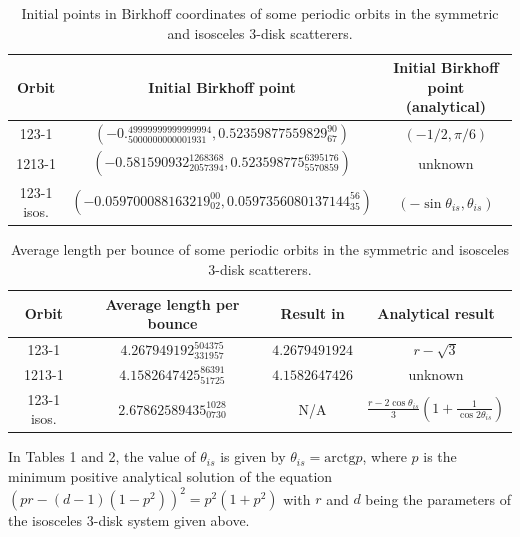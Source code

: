 \documentclass[pre, amsmath, amssymb, onecolumn, showpacs]{revtex4-1}
\begin{document}
\begin{table}[h!]
\centering
\begin{tabular}{||c c c ||} 
 \hline
 Orbit & Initial Birkhoff point & Initial Birkhoff point (analytical) \\ [0.5ex] 
 \hline\hline
 123-1 & $(-0._{5000000000001931}^{49999999999999994}, 0.52359877559829_{67}^{90})$ & $(-1/2, \pi/6)$ \\ [1ex] 
 1213-1 & $(-0.581590932_{2057394}^{1268368}, 0.523598775_{5570859}^{6395176})$ & unknown  \\ [1ex] 
 123-1 isos. & $(-0.059700088163219_{02}^{00}, 0.0597356080137144_{35}^{56})$ & $(-\sin \theta_{is}, \theta_{is})$ \\ [1ex]
 \hline
\end{tabular}
\caption{Initial points in Birkhoff coordinates of some periodic orbits in the symmetric and isosceles 3-disk scatterers.}
\label{table:1}
\end{table}

\begin{table}[h!]
\centering
\begin{tabular}{||c c c c||} 
 \hline
 Orbit & Average length per bounce & Result in \cite{gaspard2005chaos} & Analytical result \\ [0.5ex] 
 \hline\hline
 123-1 & $4.267949192_{331957}^{504375}$ & $4.2679491924$ & $r - \sqrt{3}$ \\ [1ex] 
 1213-1 & $4.1582647425_{51725}^{86391}$ & $4.1582647426$ & unknown \\ [1ex] 
 123-1 isos. & $2.67862589435_{0730}^{1028}$ & N/A & $\frac{r - 2 \cos{\theta_{is}}}{3} (1 + \frac{1}{\cos{2 \theta_{is}}})$ \\ [1ex]
 \hline
\end{tabular}
\caption{Average length per bounce of some periodic orbits in the symmetric and isosceles 3-disk scatterers.}
\label{table:1}
\end{table}

In Tables 1 and 2, the value of $\theta_{is}$ is given by $\theta_{is} = \mathrm{arctg} p$, where $p$ is the minimum positive analytical solution of the equation $(p r - (d-1)(1-p^2))^2 = p^2 (1+p^2)$ with $r$ and $d$ being the parameters of the isosceles 3-disk system given above.

\vspace*{10pt}




\end{document}
